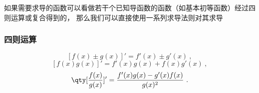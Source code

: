 

如果需要求导的函数可以看做若干个已知导函数的函数（如基本初等函数）经过四则运算或复合得到的， 那么我们可以直接使用一系列求导法则对其求导

\subsubsection{四则运算}
\begin{equation}\label{eq_DerRul_5}
[ f(x) \pm g(x) ]' = f'(x) \pm g'(x)~,
\end{equation}
\begin{equation}\label{eq_DerRul_6}
[ f(x)g(x) ]' = f'(x)g(x) + f(x)g'(x) ~,
\end{equation}
\begin{equation}\label{eq_DerRul_3}
\qty[ \frac{f(x)}{g(x)} ]'  = \frac{f'(x)g(x) - g'(x)f(x)}{g(x)^2}~.
\end{equation}

